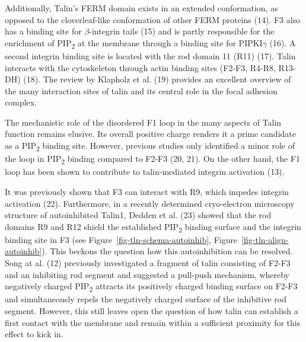 \documentclass[
  letterpaper,
  DIV=11,
  numbers=noendperiod]{scrartcl}
\begin{document}
Additionally, Talin's FERM domain exists in an extended conformation, as
opposed to the cloverleaf-like conformation of other FERM proteins (14).
F3 also has a binding site for \(\beta\)-integrin tails (15) and is
partly responsible for the enrichment of PIP\textsubscript{2} at the
membrane through a binding site for PIPKI\(\gamma\) (16). A second
integrin binding site is located with the rod domain 11 (R11) (17).
Talin interacts with the cytoskeleton through actin binding sites
(F2-F3, R4-R8, R13-DH) (18). The review by Klapholz et al. (19) provides
an excellent overview of the many interaction sites of talin and its
central role in the focal adhesion complex.

The mechanistic role of the disordered F1 loop in the many aspects of
Talin function remains elusive. Its overall positive charge renders it a
prime candidate as a PIP\textsubscript{2} binding site. However,
previous studies only identified a minor role of the loop in
PIP\textsubscript{2} binding compared to F2-F3 (20, 21). On the other
hand, the F1 loop has been shown to contribute to talin-mediated
integrin activation (13).

It was previously shown that F3 can interact with R9, which impedes
integrin activation (22). Furthermore, in a recently determined
cryo-electron microscopy structure of autoinhibited Talin1, Dedden et
al. (23) showed that the rod domains R9 and R12 shield the established
PIP\textsubscript{2} binding surface and the integrin binding site in F3
(see
Figure~\ref{fig-tln-schema-autoinhib}, Figure~\ref{fig-tln-align-autoinhib}).
This beckons the question how this autoinhibition can be resolved. Song
at al. (12) previously investigated a fragment of talin consisting of
F2-F3 and an inhibiting rod segment and suggested a pull-push mechanism,
whereby negatively charged PIP\textsubscript{2} attracts its positively
charged binding surface on F2-F3 and simultaneously repels the
negatively charged surface of the inhibitive rod segment. However, this
still leaves open the question of how talin can establish a first
contact with the membrane and remain within a sufficient proximity for
this effect to kick in.
\end{document}
